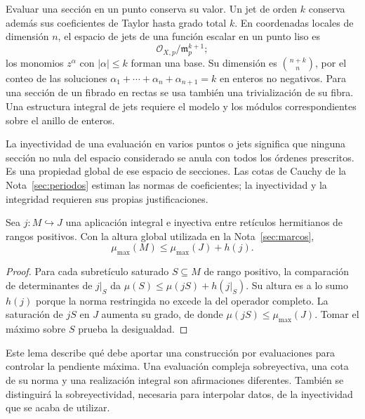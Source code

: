 Evaluar una sección en un punto conserva su valor.
Un jet de orden $k$ conserva además sus coeficientes de Taylor
hasta grado total $k$. En coordenadas locales de dimensión $n$,
el espacio de jets de una función escalar en un punto liso es
\[
 \mathcal O_{X,p}/\mathfrak m_p^{k+1};
\]
los monomios $z^\alpha$ con $|\alpha|\le k$ forman una base.
Su dimensión es $\binom{n+k}{n}$, por el conteo de las soluciones
$\alpha_1+\cdots+\alpha_n+\alpha_{n+1}=k$ en enteros no negativos.
Para una sección de un fibrado en rectas se usa también una
trivialización de su fibra. Una estructura integral de jets
requiere el modelo y los módulos correspondientes sobre el
anillo de enteros.

La inyectividad de una evaluación en varios puntos o jets
significa que ninguna sección no nula del espacio considerado
se anula con todos los órdenes prescritos. Es una propiedad
global de ese espacio de secciones.
Las cotas de Cauchy de la Nota~\ref{sec:periodos} estiman las
normas de coeficientes; la inyectividad y la integridad requieren
sus propias justificaciones.

\begin{lema}
Sea $j:M\hookrightarrow J$ una aplicación integral e inyectiva
entre retículos hermitianos de rangos positivos. Con la altura
global utilizada en la Nota~\ref{sec:marcos},
\begin{equation}
                  \mu_{\max}(M)\le\mu_{\max}(J)+h(j).
 \label{eq:geom-evaluacion-max}
\end{equation}
\label{lem:geom-evaluacion-max}
\end{lema}

\begin{proof}
Para cada subretículo saturado $S\subseteq M$ de rango positivo,
la comparación de determinantes de $j|_S$ da
$\mu(S)\le\mu(jS)+h(j|_S)$.
Su altura es a lo sumo $h(j)$ porque la norma restringida no
excede la del operador completo.
La saturación de $jS$ en $J$ aumenta su grado, de donde
$\mu(jS)\le\mu_{\max}(J)$.
Tomar el máximo sobre $S$ prueba la desigualdad.
\end{proof}

Este lema describe qué debe aportar una construcción por
evaluaciones para controlar la pendiente máxima. Una evaluación
compleja sobreyectiva, una cota de su norma y una realización
integral son afirmaciones diferentes. También se distinguirá
la sobreyectividad, necesaria para interpolar datos, de la
inyectividad que se acaba de utilizar.

